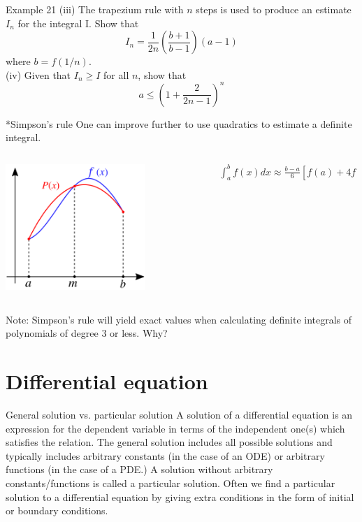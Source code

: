 \documentclass{beamer}
\begin{document}
\begin{frame}{Example 21}
(iii) The trapezium rule with $n$ steps is used to produce an estimate $I_n$ for the integral I. Show that
$$
I_n=\frac{1}{2 n}\left(\frac{b+1}{b-1}\right)(a-1)
$$
where $b=f(1 / n)$.\\
(iv) Given that $I_n \geqslant I$ for all $n$, show that
$$
a \leqslant\left(1+\frac{2}{2 n-1}\right)^n
$$
    
\end{frame}

\begin{frame}{*Simpson's rule}
    One can improve further to use quadratics to estimate a definite integral.\\
    \begin{columns}
        \begin{column}{0.5\textwidth}
            \includegraphics[width=0.7\textwidth]{Example/assets/6.png}
        \end{column}
        \begin{column}{0.5\textwidth}
            $\int_a^b f(x) d x \approx \frac{b-a}{6}\left[f(a)+4 f\left(\frac{a+b}{2}\right)+f(b)\right]$
        \end{column}
    \end{columns}
 Note: Simpson's rule will yield exact values when calculating definite integrals of polynomials of degree $3$ or less. Why?  
\end{frame}

\section{Differential equation}

\begin{frame}{General solution vs. particular solution}
    A solution of a differential equation is an expression for the dependent variable in terms of the independent one(s) which satisfies the relation. The general solution includes all possible solutions and typically includes arbitrary constants (in the case of an ODE) or arbitrary functions (in the case of a PDE.) A solution without arbitrary constants/functions is called a particular solution. Often we find a particular solution to a differential equation by giving extra conditions in the form of initial or boundary conditions.
\end{frame}
\end{document}
